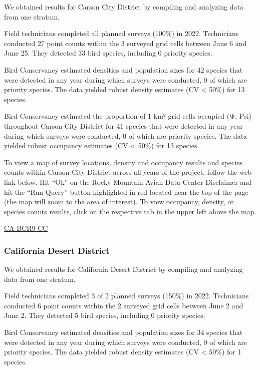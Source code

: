\documentclass[
  letterpaper,
  DIV=11,
  numbers=noendperiod,
  oneside]{scrreprt}
\begin{document}
We obtained results for Carson City District by compiling and analyzing
data from one stratum.

Field technicians completed all planned surveys (100\%) in 2022.
Technicians conducted 27 point counts within the 3 surveyed grid cells
between June 6 and June 25. They detected 33 bird species, including 0
priority species.

Bird Conservancy estimated densities and population sizes for 42 species
that were detected in any year during which surveys were conducted, 0 of
which are priority species. The data yielded robust density estimates
(CV \textless{} 50\%) for 13 species.

Bird Conservancy estimated the proportion of 1 km² grid cells occupied
(Ψ, Psi) throughout Carson City District for 41 species that were
detected in any year during which surveys were conducted, 0 of which are
priority species. The data yielded robust occupancy estimates (CV
\textless{} 50\%) for 13 species.

To view a map of survey locations, density and occupancy results and
species counts within Carson City District across all years of the
project, follow the web link below. Hit ``Ok'' on the Rocky Mountain
Avian Data Center Disclaimer and hit the ``Run Query'' button
highlighted in red located near the top of the page (the map will zoom
to the area of interest). To view occupancy, density, or species counts
results, click on the respective tab in the upper left above the map.

\href{http://www.rmbo.org/new_site/adc/QueryWindow.aspx\#N4IgzgLgTghhCuBbEAuABCAwgQQLQCFMAlATl003X3igFMZ40B7AMzQBkYA7AEzQFluMAOa1EtLhDS40mGFDBMusgJYQAnmgAiKyFBUBjCCAC+QA}{CA-BCR9-CC}

\hypertarget{california-desert-district}{%
\subsubsection{California Desert
District}\label{california-desert-district}}

We obtained results for California Desert District by compiling and
analyzing data from one stratum.

Field technicians completed 3 of 2 planned surveys (150\%) in 2022.
Technicians conducted 6 point counts within the 2 surveyed grid cells
between June 2 and June 2. They detected 5 bird species, including 0
priority species.

Bird Conservancy estimated densities and population sizes for 34 species
that were detected in any year during which surveys were conducted, 0 of
which are priority species. The data yielded robust density estimates
(CV \textless{} 50\%) for 1 species.
\end{document}
